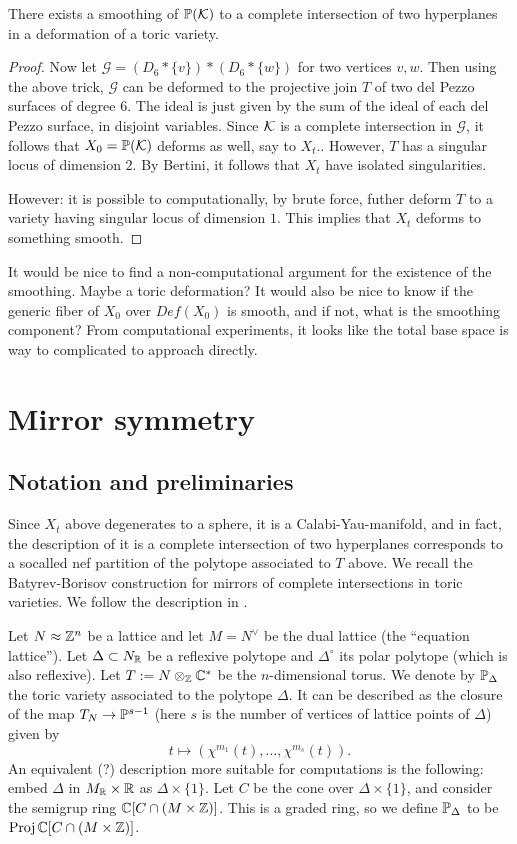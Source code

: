 \documentclass[11pt, english]{article}
\begin{document}
\begin{prop}
There exists a smoothing of $\mathbb{P}(\mathcal K)$ to a complete intersection of two hyperplanes in a deformation of a toric variety.
\end{prop}
\begin{proof}
Now let $\mathcal G=(D_6 \ast \{v \}) \ast (D_6 \ast \{w \})$ for two vertices $v,w$. Then using the above trick, $\mathcal G$ can be deformed to the projective join $T$ of two del Pezzo surfaces of degree $6$. The ideal is just given by the sum of the ideal of each del Pezzo surface, in disjoint variables. Since $\mathcal K$ is a complete intersection in $\mathcal G$, it follows that $X_0=\mathbb{P}(\mathcal K)$ deforms as well, say to $X_t$.. However, $T$ has a singular locus of dimension $2$. By Bertini, it follows that $X_t$ have isolated singularities.

However: it is possible to computationally, by brute force, futher deform $T$ to a variety having singular locus of dimension $1$. This implies that $X_t$ deforms to something smooth.
\end{proof}

It would be nice to find a non-computational argument for the existence of the smoothing. Maybe a toric deformation? It would also be nice to know if the generic fiber of $X_0$ over $Def(X_0)$ is smooth, and if not, what is the smoothing component? From computational experiments, it looks like the total base space is way to complicated to approach directly. 

\section{Mirror symmetry}

\subsection{Notation and preliminaries}

Since $X_t$ above degenerates to a sphere, it is a Calabi-Yau-manifold, and in fact, the description of it is a complete intersection of two hyperplanes corresponds to a socalled nef partition of the polytope associated to $T$ above. We recall the Batyrev-Borisov construction for mirrors of complete intersections in toric varieties. We follow the description in \cite{doran_hodgenos}.

Let $N \approx \mathbb{Z}^n$ be a lattice and let $M=N^\vee$ be the dual lattice (the ``equation lattice''). Let $\Delta \subset N_{\mathbb{R}}$ be a reflexive polytope and $\Delta^\circ$ its polar polytope (which is also reflexive). Let $T:=N \otimes_{\mathbb{Z}} \mathbb{C}^\ast$ be the $n$-dimensional torus. We denote by $\mathbb{P}_\Delta$ the toric variety associated to the polytope $\Delta$.   It can be described as the closure of the map $T_N \to \mathbb{P}^{s-1}$ (here $s$ is the number of vertices of lattice points of $\Delta$) given by
\[
t \mapsto \left( \chi^{m_1}(t), \ldots, \chi^{m_s}(t) \right).
\]
An equivalent (?) description more suitable for computations is the following: embed $\Delta$ in $M_{\mathbb{R}} \times \mathbb{R}$ as $\Delta \times \{1\}$. Let $C$ be the cone over $\Delta \times \{1\}$, and consider the semigrup ring $\mathbb{C}[C \cap (M \times \mathbb{Z})]$. This is a graded ring, so we define $\mathbb{P}_\Delta$ to be $\operatorname{Proj} \mathbb{C}[C \cap (M \times \mathbb{Z})]$.
\end{document}

